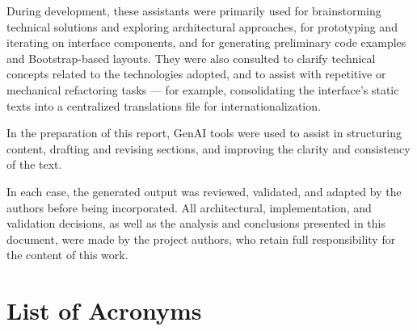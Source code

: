 \documentclass[a4paper,openany,twoside,11pt]{report}
\begin{document}
During development, these assistants were primarily used for brainstorming technical
solutions and exploring architectural approaches, for prototyping and iterating on
interface components, and for generating preliminary code examples and Bootstrap-based
layouts. They were also consulted to clarify technical concepts related to the
technologies adopted, and to assist with repetitive or mechanical refactoring tasks ---
for example, consolidating the interface's static texts into a centralized translations
file for internationalization.

In the preparation of this report, GenAI tools were used to assist in structuring
content, drafting and revising sections, and improving the clarity and consistency of
the text.

In each case, the generated output was reviewed, validated, and adapted by the authors
before being incorporated. All architectural, implementation, and validation decisions,
as well as the analysis and conclusions presented in this document, were made by the
project authors, who retain full responsibility for the content of this work.

\cleardoublepage
\tableofcontents
\cleardoublepage

\listoffigures
\cleardoublepage

\listoftables
\cleardoublepage

\chapter*{List of Acronyms}
\end{document}
